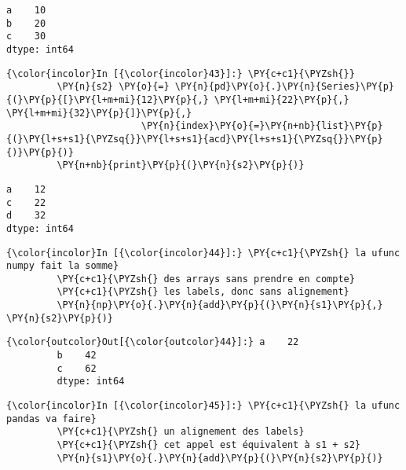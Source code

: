     \begin{Verbatim}[commandchars=\\\{\}]
a    10
b    20
c    30
dtype: int64

    \end{Verbatim}

    \begin{Verbatim}[commandchars=\\\{\}]
{\color{incolor}In [{\color{incolor}43}]:} \PY{c+c1}{\PYZsh{}}
         \PY{n}{s2} \PY{o}{=} \PY{n}{pd}\PY{o}{.}\PY{n}{Series}\PY{p}{(}\PY{p}{[}\PY{l+m+mi}{12}\PY{p}{,} \PY{l+m+mi}{22}\PY{p}{,} \PY{l+m+mi}{32}\PY{p}{]}\PY{p}{,}
                        \PY{n}{index}\PY{o}{=}\PY{n+nb}{list}\PY{p}{(}\PY{l+s+s1}{\PYZsq{}}\PY{l+s+s1}{acd}\PY{l+s+s1}{\PYZsq{}}\PY{p}{)}\PY{p}{)}
         \PY{n+nb}{print}\PY{p}{(}\PY{n}{s2}\PY{p}{)}
\end{Verbatim}


    \begin{Verbatim}[commandchars=\\\{\}]
a    12
c    22
d    32
dtype: int64

    \end{Verbatim}

    \begin{Verbatim}[commandchars=\\\{\}]
{\color{incolor}In [{\color{incolor}44}]:} \PY{c+c1}{\PYZsh{} la ufunc numpy fait la somme}
         \PY{c+c1}{\PYZsh{} des arrays sans prendre en compte}
         \PY{c+c1}{\PYZsh{} les labels, donc sans alignement}
         \PY{n}{np}\PY{o}{.}\PY{n}{add}\PY{p}{(}\PY{n}{s1}\PY{p}{,} \PY{n}{s2}\PY{p}{)}
\end{Verbatim}


\begin{Verbatim}[commandchars=\\\{\}]
{\color{outcolor}Out[{\color{outcolor}44}]:} a    22
         b    42
         c    62
         dtype: int64
\end{Verbatim}
            
    \begin{Verbatim}[commandchars=\\\{\}]
{\color{incolor}In [{\color{incolor}45}]:} \PY{c+c1}{\PYZsh{} la ufunc pandas va faire}
         \PY{c+c1}{\PYZsh{} un alignement des labels}
         \PY{c+c1}{\PYZsh{} cet appel est équivalent à s1 + s2}
         \PY{n}{s1}\PY{o}{.}\PY{n}{add}\PY{p}{(}\PY{n}{s2}\PY{p}{)}
\end{Verbatim}


